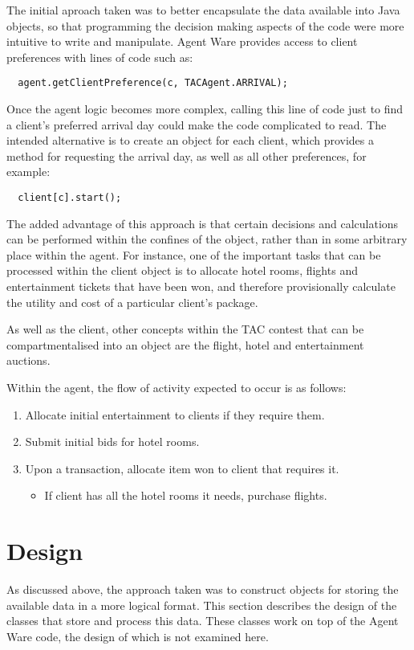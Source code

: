 \documentclass{acm_proc_article-sp}
\begin{document}
 The initial aproach taken was to better encapsulate the data available into Java objects, so that programming the decision making aspects of the code were more intuitive to write and manipulate.  Agent Ware provides access to client preferences with lines of code such as:
 \begin{verbatim}
  agent.getClientPreference(c, TACAgent.ARRIVAL);
 \end{verbatim}
 Once the agent logic becomes more complex, calling this line of code just to find a client's preferred arrival day could make the code complicated to read.  The intended alternative is to create an object for each client, which provides a method for requesting the arrival day, as well as all other preferences, for example:
 \begin{verbatim}
  client[c].start();
 \end{verbatim}
 The added advantage of this approach is that certain decisions and calculations can be performed within the confines of the object, rather than in some arbitrary place within the agent.  For instance, one of the important tasks that can be processed within the client object is to allocate hotel rooms, flights and entertainment tickets that have been won, and therefore provisionally calculate the utility and cost of a particular client's package.
 
 As well as the client, other concepts within the TAC contest that can be compartmentalised into an object are the flight, hotel and entertainment auctions.
 
 Within the agent, the flow of activity expected to occur is as follows:
 \begin{enumerate}
  \item Allocate initial entertainment to clients if they require them.
  \item Submit initial bids for hotel rooms.
  \item Upon a transaction, allocate item won to client that requires it.
   \begin{itemize}
    \item If client has all the hotel rooms it needs, purchase flights.
   \end{itemize}
 \end{enumerate}

\section{Design}

 As discussed above, the approach taken was to construct objects for storing the available data in a more logical format.  This section describes the design of the classes that store and process this data.  These classes work on top of the Agent Ware code, the design of which is not examined here.
 
\end{document}
